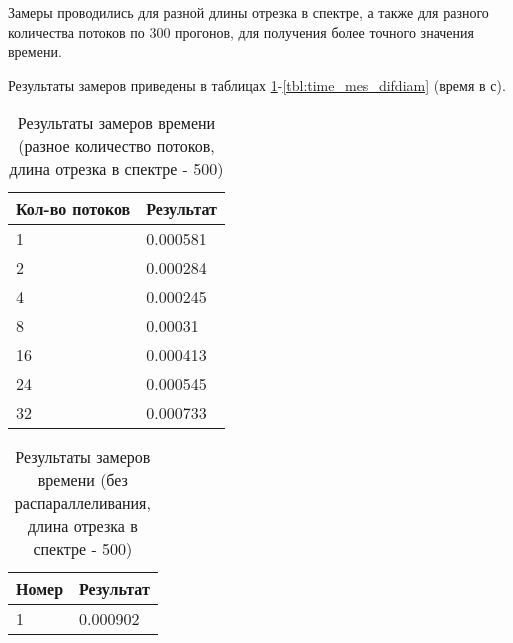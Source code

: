 Замеры проводились для разной длины отрезка в спектре, а также для разного количества потоков по 300 прогонов, для получения более точного значения времени.

Результаты замеров приведены в таблицах \ref{tbl:time_mes_par}-\ref{tbl:time_mes_difdiam} (время в с).

\begin{table}[h]
    \begin{center}
        \begin{threeparttable}
        \captionsetup{justification=raggedright,singlelinecheck=off}
        \caption{Результаты замеров времени (разное количество потоков, длина отрезка в спектре - 500)}
        \label{tbl:time_mes_par}
        \begin{tabular}{|p{6cm}|p{6cm}|}
            \hline
            Кол-во потоков & Результат \\
            \hline
            1 & 0.000581 \\ \hline 
            2 & 0.000284 \\ \hline 
            4 & 0.000245 \\ \hline 
            8 & 0.00031 \\ \hline 
            16 & 0.000413 \\ \hline 
            24 & 0.000545 \\ \hline 
            32 & 0.000733 \\ \hline 
		\end{tabular}
    \end{threeparttable}
\end{center}
\end{table}


\begin{table}[h]
    \begin{center}
        \begin{threeparttable}
        \captionsetup{justification=raggedright,singlelinecheck=off}
        \caption{Результаты замеров времени (без распараллеливания, длина отрезка в спектре - 500)}
        \label{tbl:time_mes_nopar}
        \begin{tabular}{|p{6cm}|p{6cm}|}
            \hline
            Номер & Результат \\
            \hline
            1 & 0.000902 \\ \hline 

		\end{tabular}
    \end{threeparttable}
\end{center}
\end{table}


